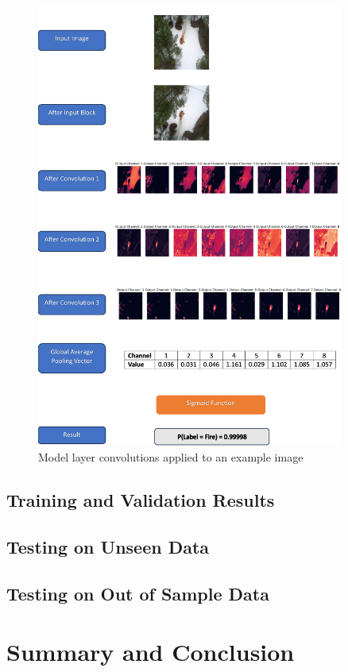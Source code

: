 \documentclass[a4paper,11pt]{article} %
\begin{document}
\begin{figure}
    \centering
    \includegraphics[width=0.9\textwidth]{../figures/model_layers_example/model_layers.png}
    \caption{Model layer convolutions applied to an example image}
\end{figure}


\subsection{Training and Validation Results}
\blindtext

\subsection{Testing on Unseen Data}
\blindtext

\subsection{Testing on Out of Sample Data}
\blindtext

\section{Summary and Conclusion}
\blindtext

\printbibliography
\end{document}
